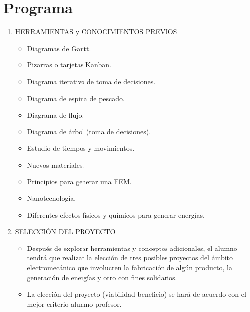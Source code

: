 \documentclass[../main]{subfiles}
\begin{document}
\section{Programa}
\begin{enumerate}
  \item HERRAMIENTAS y CONOCIMIENTOS PREVIOS
    \begin{itemize}
        Seleccionar e implementar herramientas de
        planificación como:
      \item Diagramas de Gantt.
      \item Pizarras o tarjetas Kanban.
      \item Diagrama iterativo de toma de decisiones.
      \item Diagrama de espina de pescado.
      \item Diagrama de flujo.
      \item Diagrama de árbol (toma de decisiones).
      \item Estudio de tiempos y movimientos.
      \item Nuevos materiales.
      \item Principios para generar una FEM.
      \item Nanotecnología.
      \item Diferentes efectos físicos y químicos para
        generar energías.
    \end{itemize}
  \item SELECCIÓN DEL PROYECTO
    \begin{itemize}
      \item Después de explorar herramientas y conceptos
        adicionales, el alumno tendrá que realizar la
        elección de tres posibles proyectos del ámbito
        electromecánico que involucren la fabricación de
        algún producto, la generación de energías y
        otro con fines solidarios.
      \item La elección del proyecto (viabilidad-beneficio) se hará
        de acuerdo con el mejor criterio alumno-profesor.
    \end{itemize}


\end{enumerate}
\end{document}
